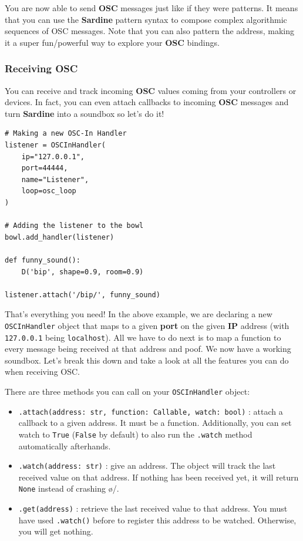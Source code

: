 \documentclass[11pt]{article}
\begin{document}
You are now able to send \textbf{OSC} messages just like if they were patterns. It means that you can use the \textbf{Sardine} pattern syntax to compose complex algorithmic sequences of OSC messages. Note that you can also pattern the address, making it a super fun/powerful way to explore your \textbf{OSC} bindings.

\subsubsection{Receiving OSC}
\label{sec:org6a3ce1c}

You can receive and track incoming \textbf{OSC} values coming from your controllers or devices. In fact, you can even attach callbacks to incoming \textbf{OSC} messages and turn \textbf{Sardine} into a soundbox so let's do it!

\begin{verbatim}
# Making a new OSC-In Handler
listener = OSCInHandler(
    ip="127.0.0.1",
    port=44444,
    name="Listener",
    loop=osc_loop
)

# Adding the listener to the bowl
bowl.add_handler(listener)

def funny_sound():
    D('bip', shape=0.9, room=0.9)

listener.attach('/bip/', funny_sound)
\end{verbatim}

That's everything you need! In the above example, we are declaring a new \texttt{OSCInHandler} object that maps to a given \textbf{port} on the given \textbf{IP} address (with \texttt{127.0.0.1} being \texttt{localhost}). All we have to do next is to map a function to every message being received at that address and poof. We now have a working soundbox. Let's break this down and take a look at all the features you can do when receiving OSC.

There are three methods you can call on your \texttt{OSCInHandler} object:

\begin{itemize}
\item \texttt{.attach(address: str, function: Callable, watch: bool)} : attach a callback to a given address. It must be a function. Additionally, you can set watch to \texttt{True} (\texttt{False} by default) to also run the \texttt{.watch} method automatically afterhands.

\item \texttt{.watch(address: str)} : give an address. The object will track the last received value on that address. If nothing has been received yet, it will return \texttt{None} instead of crashing \o/.

\item \texttt{.get(address)} : retrieve the last received value to that address. You must have used \texttt{.watch()} before to register this address to be watched. Otherwise, you will get nothing.
\end{itemize}
\end{document}
